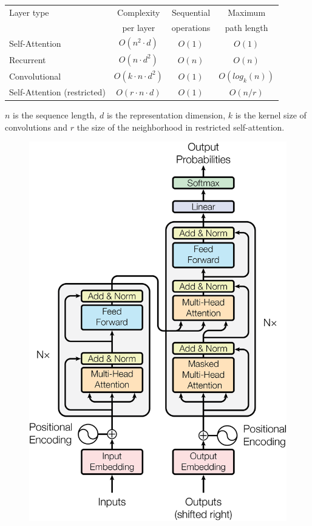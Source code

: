\begin{table}
\centering
\begin{tabular}{l|ccc}
\toprule
Layer type        &   Complexity             &  Sequential & Maximum        \\
                  &   per layer              &  operations & path length    \\
\midrule
Self-Attention    & $O(n^2 \cdot d)$         & $O(1)$      & $O(1)$         \\
Recurrent         & $O(n \cdot d^2)$         & $O(n)$      & $O(n)$         \\
Convolutional     & $O(k \cdot n \cdot d^2)$ & $O(1)$      & $O(log_k (n))$ \\
Self-Attention (restricted) & $O(r \cdot n \cdot d)$       & $O(1)$ & $O(n/r)$  \\
\bottomrule
\end{tabular}
 {
	$n$ is the sequence length, 
	$d$ is the representation dimension, 
	$k$ is the kernel size of convolutions and 
	$r$ the size of the neighborhood in restricted self-attention.
}
\label{tab:layer_complexity_comp}
\end{table}


\begin{figure}[h]
	\centering
	\includegraphics[width=0.9\columnwidth]{img/transformer_architecture.png}
	 {}
	\label{fig:transformer_architecture}
\end{figure}


